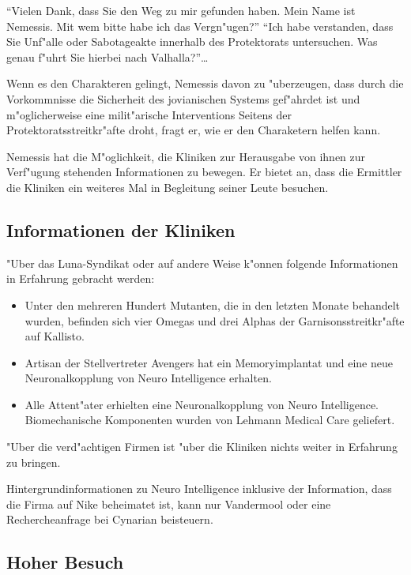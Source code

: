 "`Vielen Dank, dass Sie den Weg zu mir gefunden haben. Mein Name ist Nemessis. Mit wem bitte habe ich das Vergn"ugen?"'
"`Ich habe verstanden, dass Sie Unf"alle oder Sabotageakte innerhalb des Protektorats untersuchen. Was genau f"uhrt Sie hierbei nach Valhalla?"'\dots

Wenn es den Charakteren gelingt, Nemessis davon zu "uberzeugen, dass durch die Vorkommnisse die Sicherheit des jovianischen Systems gef"ahrdet ist und m"oglicherweise eine milit"arische Interventions Seitens der Protektoratsstreitkr"afte droht, fragt er, wie er den Charaketern helfen kann.

\begin{remarks}
	Nemessis hat die M"oglichkeit, die Kliniken zur Herausgabe von ihnen zur Verf"ugung stehenden Informationen zu bewegen. Er bietet an, dass die Ermittler die Kliniken ein weiteres Mal in Begleitung seiner Leute besuchen.
\end{remarks}

\subsection{Informationen der Kliniken}

"Uber das Luna-Syndikat oder auf andere Weise k"onnen folgende Informationen in Erfahrung gebracht werden:

\begin{itemize}
	\item Unter den mehreren Hundert Mutanten, die in den letzten Monate behandelt wurden, befinden sich vier Omegas und drei Alphas der Garnisonsstreitkr"afte auf Kallisto.
	\item Artisan der Stellvertreter Avengers hat ein Memoryimplantat und eine neue Neuronalkopplung von Neuro Intelligence erhalten.
	\item Alle Attent"ater erhielten eine Neuronalkopplung von Neuro Intelligence. Biomechanische Komponenten wurden von Lehmann Medical Care geliefert.
\end{itemize}

"Uber die verd"achtigen Firmen ist "uber die Kliniken nichts weiter in Erfahrung zu bringen.

\begin{remarks}
	Hintergrundinformationen zu Neuro Intelligence inklusive der Information, dass die Firma auf Nike beheimatet ist, kann nur Vandermool oder eine Rechercheanfrage bei Cynarian beisteuern.
\end{remarks}

\subsection{Hoher Besuch}

